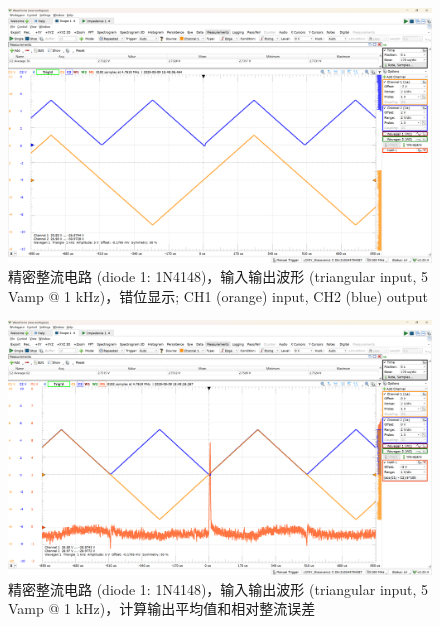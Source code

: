 \documentclass[UTF8]{article}
\begin{document}
\begin{figure}[H]\centering
    \includegraphics[width=\columnwidth]{LCE-05-精密整流/assets/1N4148/1N4148 triangular wave (1 kHz) (2).png}
    \caption{精密整流电路 (diode 1: 1N4148)，输入输出波形 (triangular input, 5 Vamp @ 1 kHz)，错位显示; CH1 (orange) input, CH2 (blue) output}
\end{figure}

\begin{figure}[H]\centering
    \includegraphics[width=\columnwidth]{LCE-05-精密整流/assets/1N4148/1N4148 triangular wave (1 kHz).png}
    \caption{精密整流电路 (diode 1: 1N4148)，输入输出波形 (triangular input, 5 Vamp @ 1 kHz)，计算输出平均值和相对整流误差}
\end{figure}
\end{document}
